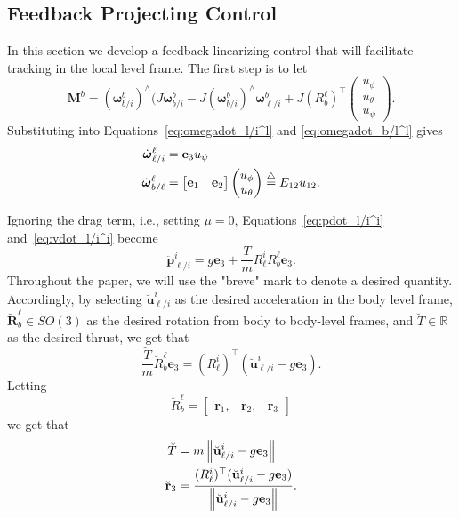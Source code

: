 \subsection{Feedback Projecting Control}

In this section we develop a feedback linearizing control that will facilitate tracking in the local level frame.  The first step is to let 
\[
\mathbf{M}^b = (\boldsymbol{\omega}_{b/i}^b)^\wedge(J\boldsymbol{\omega}_{b/i}^b - J(\boldsymbol{\omega}_{b/i}^b)^\wedge\boldsymbol{\omega}_{\ell/i}^b + J(R_b^\ell)^\top \begin{pmatrix}u_\phi \\ u_\theta \\ u_\psi \end{pmatrix}.
\]
Substituting into Equations~\eqref{eq:omegadot_l/i^l} and \eqref{eq:omegadot_b/l^l} gives
\begin{align*}
	\dot{\boldsymbol{\omega}}_{\ell/i}^\ell &=\mathbf{e}_3 u_\psi \\
	\dot{\boldsymbol{\omega}}_{b/\ell}^\ell &= 	\begin{bmatrix} \mathbf{e}_1 & \mathbf{e}_2 \end{bmatrix}\begin{pmatrix}u_\phi \\ u_\theta \end{pmatrix} \stackrel{\triangle}{=} E_{12}u_{12}.
\end{align*}

Ignoring the drag term, i.e., setting $\mu=0$, Equations~\eqref{eq:pdot_l/i^i} and~\eqref{eq:vdot_l/i^i} become
\[
\ddot{\mathbf{p}}_{\ell/i}^i = g\mathbf{e}_3 + \frac{T}{m}R_\ell^i R_b^\ell \mathbf{e}_3.
\]
Throughout the paper, we will use the "breve" mark to denote a desired quantity.  Accordingly, by selecting $\breve{\mathbf{u}}_{\ell/i}^i$ as the desired acceleration in the body level frame, $\breve{\mathbf{R}}_b^\ell\in SO(3)$ as the desired rotation from body to body-level frames, and $\breve{T}\in\mathbb{R}$ as the desired thrust, we get that
\[
\frac{\breve{T}}{m} \breve{R}_b^\ell \mathbf{e}_3 = (R_\ell^i)^\top\left(\breve{\mathbf{u}}_{\ell/i}^i - g\mathbf{e}_3\right).
\]
Letting
\[
\breve{R}_b^\ell = \begin{bmatrix} \breve{\mathbf{r}}_{1}, & \breve{\mathbf{r}}_{2}, & \breve{\mathbf{r}}_{3}\end{bmatrix}
\]
we get that 
\begin{align*}
\breve{T} &= m\left\|\breve{\mathbf{u}}_{\ell/i}^i - g\mathbf{e}_3\right\| \\
\breve{\mathbf{r}}_{3} &= \frac{(R_\ell^i)^\top (\breve{\mathbf{u}}_{\ell/i}^i - g\mathbf{e}_3)}{\left\|\breve{\mathbf{u}}_{\ell/i}^i - g\mathbf{e}_3\right\|}.
\end{align*}


